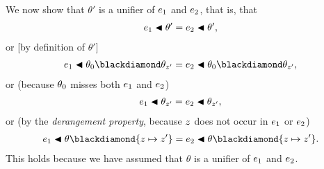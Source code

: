 \documentclass[runningheads]{llncs}
\begin{document}




     
 


We now show that  $\theta'$  is a unifier of $e_{1}$ and $e_{2}$, that is, that 
\begin{align*}
    e_{1} \blacktriangleleft \theta' = e_{2} \blacktriangleleft \theta',
\end{align*}
or [by definition of $\theta'$]
\begin{align*}
     \e{1} \apply \thet{0} \compose \thet{z'} = 
     \e{2} \apply \thet{0} \compose \thet{z'},
\end{align*}
or (because $\theta_{0}$ misses both $e_{1}$ and $e_{2}$)
\begin{align*}
     e_{1} \blacktriangleleft  \theta_{z'} = 
     e_{2} \blacktriangleleft  \theta_{z'},
\end{align*}
or (by the \emph{derangement property}, because $z$ does not occur in $e_{1}$ or $e_{2}$)
\begin{align*}
     \e{1} \apply  \theta \compose \{\var{z} \mapsto \var{z'}\} = 
     \e{2} \apply  \theta \compose \{\var{z} \mapsto \var{z'}\}.
\end{align*}
This holds because we have assumed that $\theta$ is a unifier of $e_{1}$ and $e_{2}$.
\end{document}
